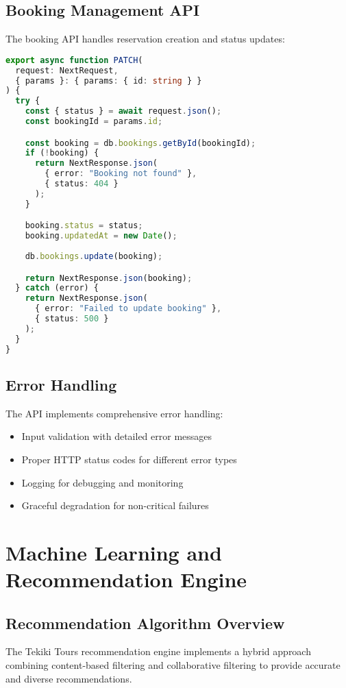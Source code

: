 \documentclass[12pt,a4paper]{article}
\begin{document}
\subsection{Booking Management API}
The booking API handles reservation creation and status updates:

\begin{lstlisting}[language=typescript, caption=Booking API Implementation]
export async function PATCH(
  request: NextRequest,
  { params }: { params: { id: string } }
) {
  try {
    const { status } = await request.json();
    const bookingId = params.id;

    const booking = db.bookings.getById(bookingId);
    if (!booking) {
      return NextResponse.json(
        { error: "Booking not found" }, 
        { status: 404 }
      );
    }

    booking.status = status;
    booking.updatedAt = new Date();
    
    db.bookings.update(booking);

    return NextResponse.json(booking);
  } catch (error) {
    return NextResponse.json(
      { error: "Failed to update booking" }, 
      { status: 500 }
    );
  }
}
\end{lstlisting}

\subsection{Error Handling}
The API implements comprehensive error handling:
\begin{itemize}
    \item Input validation with detailed error messages
    \item Proper HTTP status codes for different error types
    \item Logging for debugging and monitoring
    \item Graceful degradation for non-critical failures
\end{itemize}

\newpage

\section{Machine Learning and Recommendation Engine}

\subsection{Recommendation Algorithm Overview}
The Tekiki Tours recommendation engine implements a hybrid approach combining content-based filtering and collaborative filtering to provide accurate and diverse recommendations.
\end{document}
